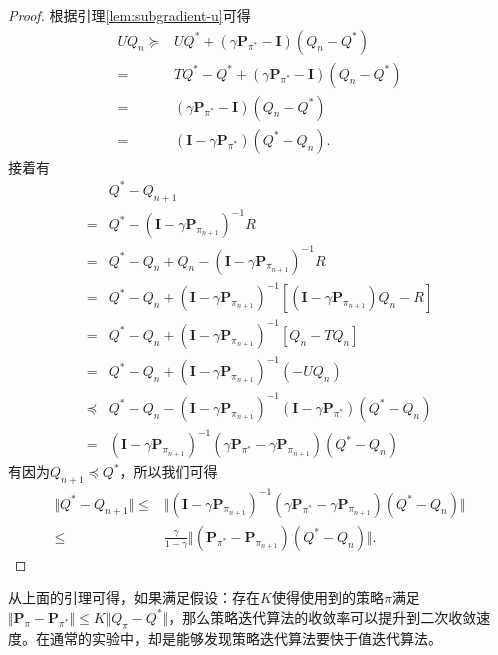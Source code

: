 \begin{proof}
    根据引理\ref{lem:subgradient-u}可得
    \begin{align*}
    UQ_{n} 
    \succeq& UQ^* + (\gamma\mathbf{P}_{\pi^*} - \mathbf{I})(Q_{n} - Q^*)\\
    =& TQ^* - Q^* + (\gamma\mathbf{P}_{\pi^*} - \mathbf{I})(Q_{n} - Q^*)\\
    =& (\gamma\mathbf{P}_{\pi^*} - \mathbf{I})(Q_{n} - Q^*)\\
    =& (\mathbf{I} - \gamma\mathbf{P}_{\pi^*})(Q^* - Q_{n}).
    \end{align*}
    接着有
    \begin{align*}
        &Q^* - Q_{n+1} \\
        =& Q^* - (\mathbf{I} - \gamma \mathbf{P}_{\pi_{n+1}})^{-1}R\\
        =& Q^* - Q_n + Q_n - (\mathbf{I} - \gamma \mathbf{P}_{\pi_{n+1}})^{-1}R\\
        =& Q^* - Q_n + (\mathbf{I} - \gamma \mathbf{P}_{\pi_{n+1}})^{-1}
            [(\mathbf{I} - \gamma \mathbf{P}_{\pi_{n+1}}) Q_n - R]\\
        =& Q^* - Q_n + (\mathbf{I} - \gamma \mathbf{P}_{\pi_{n+1}})^{-1}
            [Q_n - TQ_n]\\
        =& Q^* - Q_n + (\mathbf{I} - \gamma \mathbf{P}_{\pi_{n+1}})^{-1}
            (-UQ_n)\\
        \preceq& Q^* - Q_n - (\mathbf{I} - \gamma \mathbf{P}_{\pi_{n+1}})^{-1}
            (\mathbf{I} - \gamma \mathbf{P}_{\pi^*})(Q^* - Q_n)\\
        =& (\mathbf{I} - \gamma \mathbf{P}_{\pi_{n+1}})^{-1}
            (\gamma\mathbf{P}_{\pi^*} - \gamma\mathbf{P}_{\pi_{n+1}})
            (Q^* - Q_n)
    \end{align*}
    有因为$Q_{n+1} \preceq Q^*$，所以我们可得
    \begin{align*}
        \Vert Q^* - Q_{n+1}\Vert
        \le& 
        \Vert (\mathbf{I} - \gamma \mathbf{P}_{\pi_{n+1}})^{-1}
            (\gamma\mathbf{P}_{\pi^*} - \gamma\mathbf{P}_{\pi_{n+1}})
            (Q^* - Q_n) \Vert\\
        \le& \frac{\gamma}{1-\gamma}
            \Vert 
            (\mathbf{P}_{\pi^*} - \mathbf{P}_{\pi_{n+1}})
            (Q^* - Q_n)
            \Vert.
    \end{align*}
\end{proof}

从上面的引理可得，如果满足假设：存在$K$使得使用到的策略$\pi$满足$\Vert \mathbf{P}_{\pi} - \mathbf{P}_{\pi^*}\Vert \le K \Vert Q_{\pi} - Q^* \Vert$，那么策略迭代算法的收敛率可以提升到二次收敛速度。在通常的实验中，却是能够发现策略迭代算法要快于值迭代算法。

